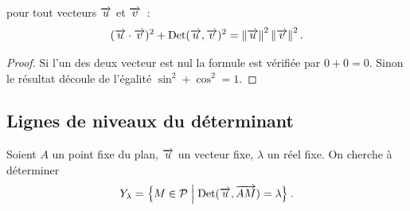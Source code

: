 \begin{prop}
    pour tout vecteurs \(\overrightarrow{u}\) et \(\overrightarrow{v}\)~:
    \begin{equation}
        (\overrightarrow{u} \cdot \overrightarrow{v})^2 + \operatorname{Det}(\overrightarrow{u} , \overrightarrow{v})^2 = \left\lVert\overrightarrow{u}\right\rVert^2 \left\lVert\overrightarrow{v}\right\rVert^2.
    \end{equation}
\end{prop}

\begin{proof}
    Si l'un des deux vecteur est nul la formule est vérifiée par \(0 + 0 = 0\). 
    Sinon le résultat découle de l'égalité \(\sin^2 + \cos^2 = 1\).
\end{proof}

\subsection{Lignes de niveaux du déterminant}

Soient \(A\) un point fixe du plan, \(\overrightarrow{u}\) un vecteur fixe, \(\lambda\) un réel 
fixe. On cherche à déterminer
\begin{equation} 
    Y_\lambda = \left\{M \in \mathcal{P}\mathrel{}\middle|\mathrel{}\operatorname{Det}(\overrightarrow{u}, \overrightarrow{AM}) = \lambda\right\}.
\end{equation}

